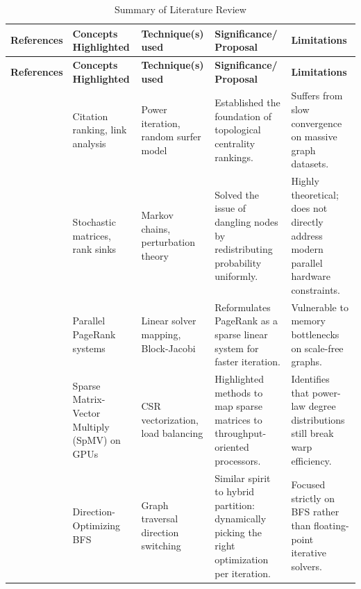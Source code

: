 \documentclass[12pt,a4paper]{article}
\begin{document}
	\begin{longtable}[htp]{|p{2.5cm}|p{2.5cm}|p{2.5cm}|p{3.5cm}|p{3.5cm}|}
	\caption{Summary of Literature Review}
	\label{Table1} \\
	\toprule \textbf{References} & \textbf{Concepts Highlighted} & \textbf{Technique(s) used} & \textbf{Significance/ Proposal} & \textbf{Limitations} \\
	\midrule \endfirsthead
    \toprule \textbf{References} & \textbf{Concepts Highlighted} & \textbf{Technique(s) used} & \textbf{Significance/ Proposal} & \textbf{Limitations} \\
	\midrule \endhead
		\cite{page1999pagerank} & Citation ranking, link analysis & Power iteration, random surfer model & Established the foundation of topological centrality rankings. & Suffers from slow convergence on massive graph datasets. \\
		\midrule \cite{langville2004deeper} & Stochastic matrices, rank sinks & Markov chains, perturbation theory & Solved the issue of dangling nodes by redistributing probability uniformly. & Highly theoretical; does not directly address modern parallel hardware constraints. \\
        \midrule \cite{gleich2004parallel} & Parallel PageRank systems & Linear solver mapping, Block-Jacobi & Reformulates PageRank as a sparse linear system for faster iteration. & Vulnerable to memory bottlenecks on scale-free graphs. \\
        \midrule \cite{bell2009implementing} & Sparse Matrix-Vector Multiply (SpMV) on GPUs & CSR vectorization, load balancing & Highlighted methods to map sparse matrices to throughput-oriented processors. & Identifies that power-law degree distributions still break warp efficiency. \\
        \midrule \cite{beamer2012direction} & Direction-Optimizing BFS & Graph traversal direction switching & Similar spirit to hybrid partition: dynamically picking the right optimization per iteration. & Focused strictly on BFS rather than floating-point iterative solvers. \\
	\bottomrule
	\end{longtable}
\end{document}
